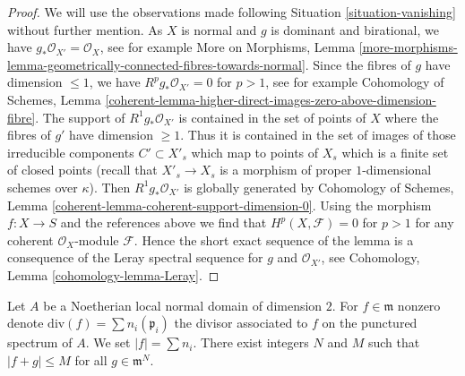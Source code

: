 \begin{proof}
We will use the observations made following Situation \ref{situation-vanishing}
without further mention. As $X$ is normal and $g$ is dominant and
birational, we have $g_*\mathcal{O}_{X'} = \mathcal{O}_X$, see for
example More on Morphisms, Lemma
\ref{more-morphisms-lemma-geometrically-connected-fibres-towards-normal}.
Since the fibres of $g$ have dimension $\leq 1$, we have
$R^pg_*\mathcal{O}_{X'} = 0$ for $p > 1$, see for example
Cohomology of Schemes, Lemma
\ref{coherent-lemma-higher-direct-images-zero-above-dimension-fibre}.
The support of $R^1g_*\mathcal{O}_{X'}$ is contained in the set of points of
$X$ where the fibres of $g'$ have dimension $\geq 1$. Thus
it is contained in the set of images of those
irreducible components $C' \subset X'_s$ which map to points of $X_s$
which is a finite set of closed points
(recall that $X'_s \to X_s$ is a morphism of proper $1$-dimensional
schemes over $\kappa$). Then $R^1g_*\mathcal{O}_{X'}$ is globally
generated by
Cohomology of Schemes, Lemma \ref{coherent-lemma-coherent-support-dimension-0}.
Using the morphism $f : X \to S$ and the references above we find that
$H^p(X, \mathcal{F}) = 0$ for $p > 1$ for any coherent $\mathcal{O}_X$-module
$\mathcal{F}$. Hence the short exact sequence of the lemma is a consequence
of the Leray spectral sequence for $g$ and $\mathcal{O}_{X'}$, see
Cohomology, Lemma \ref{cohomology-lemma-Leray}.
\end{proof}

\begin{lemma}
\label{lemma-bound-primes}
Let $A$ be a Noetherian local normal domain of dimension $2$.
For $f \in \mathfrak m$ nonzero denote
$\text{div}(f) = \sum n_i (\mathfrak p_i)$
the divisor associated to $f$ on the punctured spectrum of $A$.
We set $|f| = \sum n_i$. There exist integers $N$ and $M$
such that $|f + g| \leq M$ for all $g \in \mathfrak m^N$.
\end{lemma}

